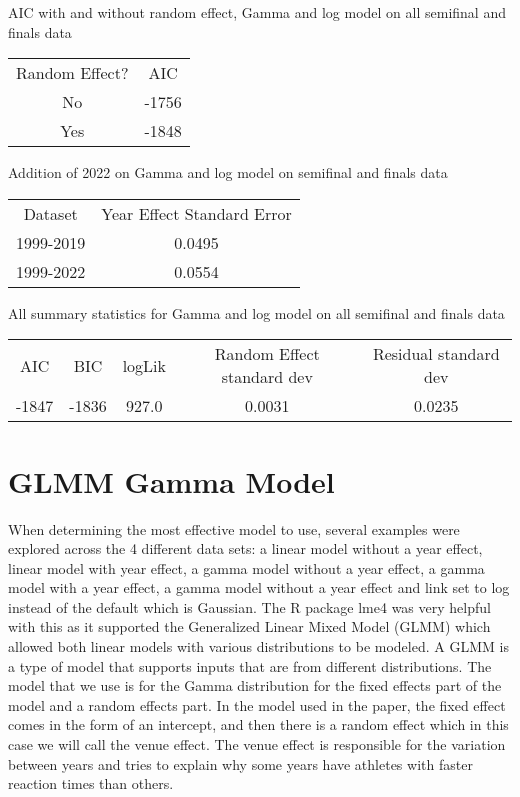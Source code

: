\documentclass[12pt, letterpaper, titlepage]{article}
\begin{document}
AIC with and without random effect, Gamma and log model on all semifinal and finals data
\begin{center}
  \begin{tabular}{|c | c|}
    \hline
    Random Effect? & AIC \\
    No & -1756 \\
    Yes & -1848 \\
    \hline
  \end{tabular}
\end{center}

Addition of 2022 on Gamma and log model on semifinal and finals data
\begin{center}
  \begin{tabular}{|c | c|}
    \hline
    Dataset & Year Effect Standard Error \\
    1999-2019 & 0.0495 \\
    1999-2022 & 0.0554 \\
    \hline
  \end{tabular}
\end{center}

All summary statistics for Gamma and log model on all semifinal and finals data
\begin{center}
  \begin{tabular}{| c | c | c | c | c |}
    \hline
    AIC & BIC & logLik & Random Effect standard dev & Residual standard dev \\
    -1847 & -1836 & 927.0 & 0.0031 & 0.0235 \\
    \hline
  \end{tabular}
\end{center}

    



\section{GLMM Gamma Model}
When determining the most effective model to use, several examples were
explored across the 4 different data sets: a linear model without a year effect,
linear model with year effect, a gamma model without a year effect, a gamma model
with a year effect, a gamma model without a year effect and link set to log instead
of the default which is Gaussian.  The R package lme4 was very helpful with this
as it supported the Generalized Linear Mixed Model (GLMM) which allowed both
linear models with various distributions to be modeled\citep{Rpkg:lme4}. A GLMM is a type of model
that supports inputs that are from different distributions.  The model that we use is for the
Gamma distribution for the fixed effects part of the model and a random effects part.  In
the model used in the paper, the fixed effect comes in the form of an intercept, and then
there is a random effect which in this case we will call the venue effect.  The
venue effect is responsible for the variation between years and tries to explain
why some years have athletes with faster reaction times than others.
\end{document}
